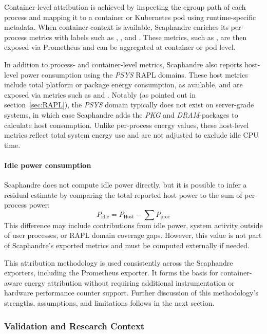 Container-level attribution is achieved by inspecting the cgroup path of each process and mapping it to a container or Kubernetes pod using runtime-specific metadata. When container context is available, Scaphandre enriches its per-process metrics with labels such as , , and . These metrics, such as , are then exposed via Prometheus and can be aggregated at container or pod level.

In addition to process- and container-level metrics, Scaphandre also reports host-level power consumption using the \textit{PSYS} RAPL domains. These host metrics include total platform or package energy consumption, as available, and are exposed via metrics such as  and . Notably (as pointed out in section~\ref{sec:RAPL}), the \textit{PSYS} domain typically does not exist on server-grade systems, in which case Scaphandre adds the \textit{PKG} and \textit{DRAM}-packages to calculate host consumption. Unlike per-process energy values, these host-level metrics reflect total system energy use and are not adjusted to exclude idle CPU time.

\paragraph{Idle power consumption}
Scaphandre does not compute idle power directly, but it is possible to infer a residual estimate by comparing the total reported host power to the sum of per-process power:
\[
P_{\text{idle}} = P_{\text{Host}} - \sum P_{\text{proc}}
\]
This difference may include contributions from idle power, system activity outside of user processes, or RAPL domain coverage gaps. However, this value is not part of Scaphandre’s exported metrics and must be computed externally if needed.

This attribution methodology is used consistently across the Scaphandre exporters, including the Prometheus exporter. It forms the basis for container-aware energy attribution without requiring additional instrumentation or hardware performance counter support. Further discussion of this methodology’s strengths, assumptions, and limitations follows in the next section.

\subsubsection{Validation and Research Context}
\label{sec:scaphandre-validation}

